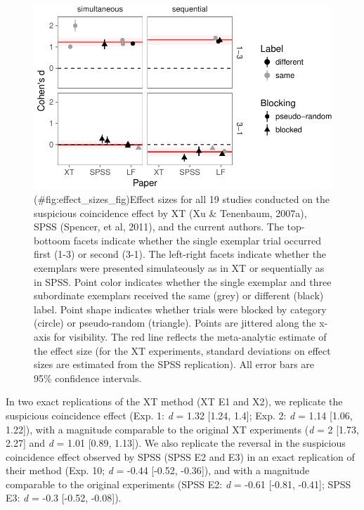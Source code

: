 \documentclass[english,floatsintext,man]{apa6}
\newcounter{author}
\theoremstyle{definition}
\theoremstyle{definition}
\theoremstyle{remark}
\begin{document}
\begin{figure}
\centering
\includegraphics{xtmem_files/figure-latex/effect_sizes_fig-1.pdf}
\caption{(\#fig:effect\_sizes\_fig)Effect sizes for all 19 studies
conducted on the suspicious coincidence effect by XT (Xu \& Tenenbaum,
2007a), SPSS (Spencer, et al, 2011), and the current authors. The
top-bottoom facets indicate whether the single exemplar trial occurred
first (1-3) or second (3-1). The left-right facets indicate whether the
exemplars were presented simulateously as in XT or sequentially as in
SPSS. Point color indicates whether the single exemplar and three
subordinate exemplars received the same (grey) or different (black)
label. Point shape indicates whether trials were blocked by category
(circle) or pseudo-random (triangle). Points are jittered along the
x-axis for visibility. The red line reflects the meta-analytic estimate
of the effect size (for the XT experiments, standard deviations on
effect sizes are estimated from the SPSS replication). All error bars
are 95\% confidence intervals.}
\end{figure}

In two exact replications of the XT method (XT E1 and X2), we replicate
the suspicious coincidence effect (Exp. 1: \emph{d} = 1.32 {[}1.24,
1.4{]}; Exp. 2: \emph{d} = 1.14 {[}1.06, 1.22{]}), with a magnitude
comparable to the original XT experiments (\emph{d} = 2 {[}1.73, 2.27{]}
and \emph{d} = 1.01 {[}0.89, 1.13{]}). We also replicate the reversal in
the suspicious coincidence effect observed by SPSS (SPSS E2 and E3) in
an exact replication of their method (Exp. 10; \emph{d} = -0.44
{[}-0.52, -0.36{]}), and with a magnitude comparable to the original
experiments (SPSS E2: \emph{d} = -0.61 {[}-0.81, -0.41{]}; SPSS E3:
\emph{d} = -0.3 {[}-0.52, -0.08{]}).
\end{document}
